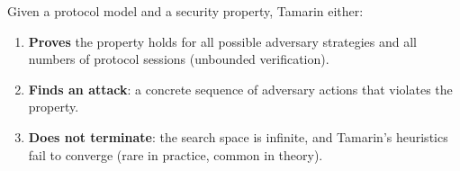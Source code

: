 Given a protocol model and a security property, Tamarin either:
\begin{enumerate}[nosep]
  \item \textbf{Proves} the property holds for all possible adversary strategies and all
    numbers of protocol sessions (unbounded verification).
  \item \textbf{Finds an attack}: a concrete sequence of adversary actions that violates
    the property.
  \item \textbf{Does not terminate}: the search space is infinite, and Tamarin's heuristics
    fail to converge (rare in practice, common in theory).
\end{enumerate}

